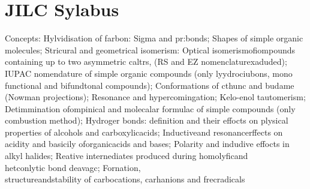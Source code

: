 \documentclass[10pt]{article}
\begin{document}
\section*{JILC Sylabus}
Concepts: Hylvidisation of farbon: Sigma and pr:bonds; Shapes of simple organic molecules; Stricural and geometrical isomerism: Optical isomerismofiompounds containing up to two asymmetric caltrs, (RS and EZ nomenclaturexaduded); IUPAC nomendature of simple organic compounds (only lyydrociubons, mono functional and bifundtonal compounds); Conformations of cthunc and budame (Nowman projections); Resonance and hypercomingation; Kelo-enol tautomerism; Detimmination ofompinical and molecalar formulac of simple compounds (only combustion method); Hydroger bonds: definition and their effocts on plysical properties of alcohols and carboxylicacids; Inductiveand resonancerffects on acidity and basicily oforganicacids and bases; Polarity and indudive effocts in alkyl halides; Reative internediates produced during homolyficand\\
hetconlytic bond deavagc; Fornation,\\
structureandstability of carbocations, carhanions and frecradicals
\end{document}
